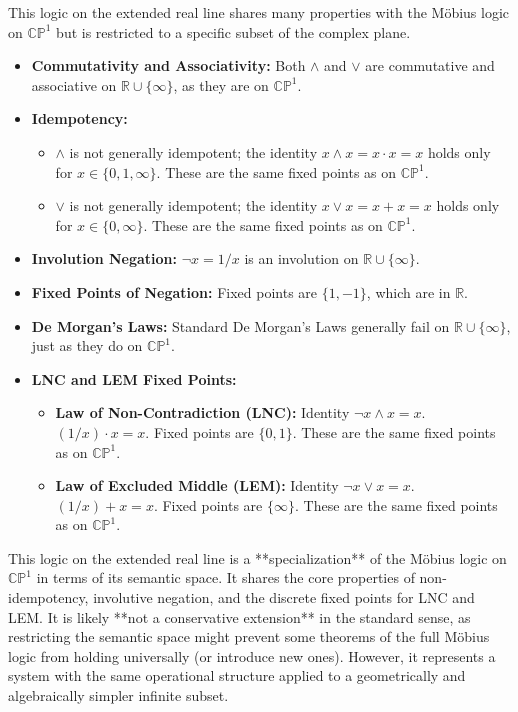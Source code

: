 \documentclass{article}
\begin{document}
	This logic on the extended real line shares many properties with the M\"{o}bius logic on $\mathbb{CP}^1$ but is restricted to a specific subset of the complex plane.
	
	\begin{itemize}
		\item \textbf{Commutativity and Associativity:} Both $\wedge$ and $\vee$ are commutative and associative on $\mathbb{R} \cup \{\infty\}$, as they are on $\mathbb{CP}^1$.
		\item \textbf{Idempotency:}
		\begin{itemize}
			\item \(\wedge\) is not generally idempotent; the identity \(x \wedge x = x \cdot x = x\) holds only for \(x \in \{0, 1, \infty\}\). These are the same fixed points as on $\mathbb{CP}^1$.
			\item \(\vee\) is not generally idempotent; the identity \(x \vee x = x + x = x\) holds only for \(x \in \{0, \infty\}\). These are the same fixed points as on $\mathbb{CP}^1$.
		\end{itemize}
		\item \textbf{Involution Negation:} $\neg x = 1/x$ is an involution on $\mathbb{R} \cup \{\infty\}$.
		\item \textbf{Fixed Points of Negation:} Fixed points are $\{1, -1\}$, which are in $\mathbb{R}$.
		\item \textbf{De Morgan's Laws:} Standard De Morgan's Laws generally fail on $\mathbb{R} \cup \{\infty\}$, just as they do on $\mathbb{CP}^1$.
		\item \textbf{LNC and LEM Fixed Points:}
		\begin{itemize}
			\item \textbf{Law of Non-Contradiction (LNC):} Identity \(\neg x \wedge x = x\). \((1/x) \cdot x = x\). Fixed points are $\{0, 1\}$. These are the same fixed points as on $\mathbb{CP}^1$.
			\item \textbf{Law of Excluded Middle (LEM):} Identity \(\neg x \vee x = x\). \((1/x) + x = x\). Fixed points are $\{\infty\}$. These are the same fixed points as on $\mathbb{CP}^1$.
		\end{itemize}
	\end{itemize}
	
	This logic on the extended real line is a **specialization** of the M\"{o}bius logic on $\mathbb{CP}^1$ in terms of its semantic space. It shares the core properties of non-idempotency, involutive negation, and the discrete fixed points for LNC and LEM. It is likely **not a conservative extension** in the standard sense, as restricting the semantic space might prevent some theorems of the full M\"{o}bius logic from holding universally (or introduce new ones). However, it represents a system with the same operational structure applied to a geometrically and algebraically simpler infinite subset.
	
\end{document}
